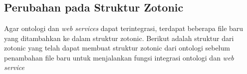 \chapter{\babLima}

\section{Perubahan pada Struktur Zotonic}

Agar ontologi dan \textit{web services} dapat terintegrasi, terdapat beberapa file baru yang ditambahkan ke dalam struktur zotonic. Berikut adalah struktur dari zotonic yang telah dapat membuat struktur zotonic dari ontologi sebelum penambahan file baru untuk menjalankan fungsi integrasi ontologi dan \textit{web service}\\
